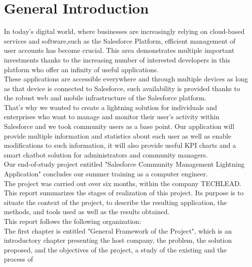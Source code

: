 
\chapter*{General Introduction}

%
In today's digital world, where businesses are increasingly relying on cloud-based services and software,such as the Salesforce Platform, efficient management of user accounts has become crucial. This area demonstrates
multiple important investments thanks to the increasing number of interested developers
in this platform who offer an infinity of useful applications.\\
These applications are accessible everywhere and through multiple devices as long as that device is connected to Salesforce, such availability is provided thanks to the robust web and mobile infrastructure of the Salesforce platform.\\
That's why we wanted to create a lightning solution for individuals and enterprises who want to manage and monitor their user's activity within Salesforce and we took community users as a base point. Our application will provide multiple information and statistics about each user as well as enable modifications to such information, it will also provide useful KPI charts and a smart chatbot solution for administrators and community managers.\\
Our end-of-study project entitled "Salesforce Community Management Lightning Application" concludes our summer training as a computer engineer.\\
The project was carried out over six months, within the company TECHLEAD. This report summarizes the stages of realization of this
project. Its purpose is to situate the context of the project, to describe the resulting application, the methods, and tools used as well as the results obtained.\\
This report follows the following organization:\\
The first chapter is entitled "General Framework of the Project", which is an introductory chapter presenting the host company, the problem, the solution
proposed, and the objectives of the project, a study of the existing and the process of
